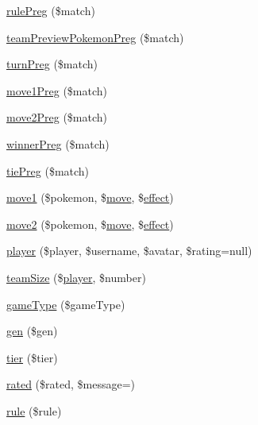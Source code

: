 \begin{DoxyCompactItemize}
\hyperlink{class_replay_parser_ab8290a1fa1d0dce5b391fc53ad808775}{rule\+Preg} (\$match)
\item 
\hyperlink{class_replay_parser_a9450b4b031bb492a63c22d86a50dc9c2}{team\+Preview\+Pokemon\+Preg} (\$match)
\item 
\hyperlink{class_replay_parser_aafb3432e5c966902df375fe1614a4cae}{turn\+Preg} (\$match)
\item 
\hyperlink{class_replay_parser_a85c7106777dea6a2770e60ba29b7d467}{move1\+Preg} (\$match)
\item 
\hyperlink{class_replay_parser_a2bf5906c71cfd4d61ba347000663f1b0}{move2\+Preg} (\$match)
\item 
\hyperlink{class_replay_parser_ae196d3d060e95dfe63e91afe4da55f15}{winner\+Preg} (\$match)
\item 
\hyperlink{class_replay_parser_a44e81699ecad590f46d29a99ece30a2e}{tie\+Preg} (\$match)
\item 
\hyperlink{class_replay_parser_a82f21a21c1885dd9fc471ef5f97fab5e}{move1} (\$pokemon, \$\hyperlink{class_replay_parser_af8789f1b8220b77c6054efba8fa84c7a}{move}, \$\hyperlink{class_replay_parser_a928bb19cb57383719013f8ba5319173c}{effect})
\item 
\hyperlink{class_replay_parser_a661a82797d10dec898444269835968a8}{move2} (\$pokemon, \$\hyperlink{class_replay_parser_af8789f1b8220b77c6054efba8fa84c7a}{move}, \$\hyperlink{class_replay_parser_a928bb19cb57383719013f8ba5319173c}{effect})
\item 
\hyperlink{class_replay_parser_a42c1054e4e59fa30a1582c8a9f625a54}{player} (\$player, \$username, \$avatar, \$rating=null)
\item 
\hyperlink{class_replay_parser_aa7a6115ff4ea8b4a3f765a963c55d9fd}{team\+Size} (\$\hyperlink{class_replay_parser_a42c1054e4e59fa30a1582c8a9f625a54}{player}, \$number)
\item 
\hyperlink{class_replay_parser_a0e77a5f3424e6755f45c77fb7e0a67d8}{game\+Type} (\$game\+Type)
\item 
\hyperlink{class_replay_parser_a5e8c15fd657011be38f1d7609395cd6d}{gen} (\$gen)
\item 
\hyperlink{class_replay_parser_af5dd7c479acbd2646fe9d8ed37e74e79}{tier} (\$tier)
\item 
\hyperlink{class_replay_parser_aedbd02d59b5048e0f558e234a2e28c24}{rated} (\$rated, \$message=\textquotesingle{}\textquotesingle{})
\item 
\hyperlink{class_replay_parser_adb498edf75134b50c3ccc4ca93727640}{rule} (\$rule)
\item 

\end{DoxyCompactItemize}
